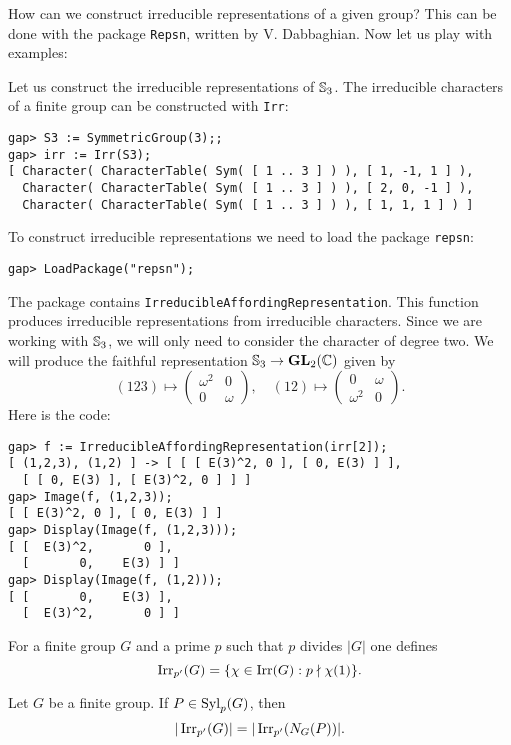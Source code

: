 How can we construct irreducible representations of a given group? This can be
done with the package \lstinline{Repsn}, written by V.  Dabbaghian. 
Now let us play with examples:

\begin{example}
Let us construct the irreducible representations of $\mathbb{S}_3$. 
The irreducible characters of a finite group
can be constructed with \lstinline{Irr}:
\begin{lstlisting}
gap> S3 := SymmetricGroup(3);;
gap> irr := Irr(S3);
[ Character( CharacterTable( Sym( [ 1 .. 3 ] ) ), [ 1, -1, 1 ] ), 
  Character( CharacterTable( Sym( [ 1 .. 3 ] ) ), [ 2, 0, -1 ] ), 
  Character( CharacterTable( Sym( [ 1 .. 3 ] ) ), [ 1, 1, 1 ] ) ]
\end{lstlisting}
To construct irreducible representations we need to load the package
\lstinline{repsn}:
\begin{lstlisting}
gap> LoadPackage("repsn");
\end{lstlisting}

The package contains \lstinline{IrreducibleAffordingRepresentation}. This function produces 
irreducible representations from irreducible characters. Since we are working with $\mathbb{S}_3$, we will only need
to consider the character of degree two. We will produce 
the faithful representation $\mathbb{S}_3\to\mathbf{GL}_2(\mathbb{C})$ given by 
\[
	(123)\mapsto\begin{pmatrix}
		\omega^2 & 0\\
		0 & \omega
	\end{pmatrix},
	\quad
	(12)\mapsto\begin{pmatrix}
		0 & \omega \\
		\omega^2 & 0
	\end{pmatrix}.
\]
Here is the code:
\begin{lstlisting}
gap> f := IrreducibleAffordingRepresentation(irr[2]);
[ (1,2,3), (1,2) ] -> [ [ [ E(3)^2, 0 ], [ 0, E(3) ] ], 
  [ [ 0, E(3) ], [ E(3)^2, 0 ] ] ]
gap> Image(f, (1,2,3));
[ [ E(3)^2, 0 ], [ 0, E(3) ] ]
gap> Display(Image(f, (1,2,3)));
[ [  E(3)^2,       0 ],
  [       0,    E(3) ] ]
gap> Display(Image(f, (1,2)));
[ [       0,    E(3) ],
  [  E(3)^2,       0 ] ]
\end{lstlisting}
\end{example}

For a finite group $G$ and a prime $p$ such that $p$ divides $|G|$ one defines
\[
	\operatorname{Irr}_{p'}(G)=\{\chi\in\operatorname{Irr}(G):p\nmid\chi(1)\}.
\]

\begin{conjecture}[McKay]
Let $G$ be a finite group. If $P\in\mathrm{Syl}_p(G)$,
then 
  \[
	|\operatorname{Irr}_{p'}(G)|=|\operatorname{Irr}_{p'}(N_G(P))|.
  \]
\end{conjecture}

